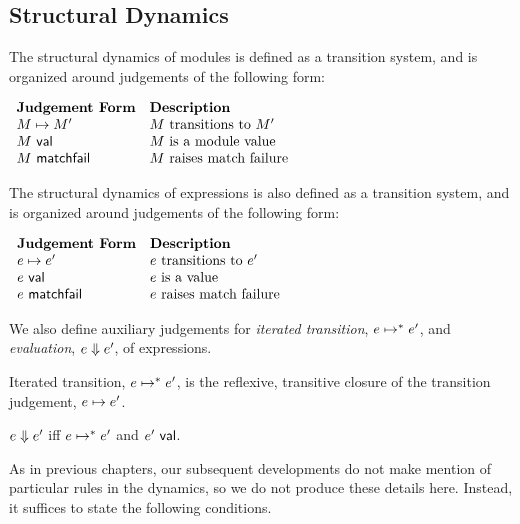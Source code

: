 \subsection{Structural Dynamics}
The structural dynamics of modules is defined as a transition system, and is organized around judgements of the following form:

\vspace{10px}
$\begin{array}{ll}
\textbf{Judgement Form} & \textbf{Description}\\
M \mapsto M' & \text{$M$ transitions to $M'$}\\
M~\mathsf{val} & \text{$M$ is a module value}\\
M~\mathsf{matchfail} & \text{$M$ raises match failure}
\end{array}$
\vspace{10px}

The structural dynamics of expressions is also defined as a transition system, and is organized around judgements of the following form:

\vspace{10px}
$\begin{array}{ll}
\textbf{Judgement Form} & \textbf{Description}\\
e \mapsto e' & \text{$e$ transitions to $e'$}\\
e~\mathsf{val} & \text{$e$ is a value}\\
e~\mathsf{matchfail} & \text{$e$ raises match failure}
\end{array}$
\vspace{10px}

We also define auxiliary judgements for \emph{iterated transition}, $e \mapsto^{*} e'$, and \emph{evaluation}, $e \Downarrow e'$, of expressions.

\begingroup
\def\thetheorem{\ref{defn:iterated-transition-P}}
\begin{definition} Iterated transition, $e \mapsto^{*} e'$, is the reflexive, transitive closure of the transition judgement, $e \mapsto e'$.\end{definition}
\endgroup

\begingroup
\def\thetheorem{\ref{defn:evaluation-P}}
\begin{definition}[Evaluation] $e \Downarrow e'$ iff $e \mapsto^{*} e'$ and $e'~\mathsf{val}$. \end{definition}
\endgroup

As in previous chapters, our subsequent developments do not make mention of particular rules in the dynamics, so we do not produce these details here. Instead, it suffices to state the following conditions.

